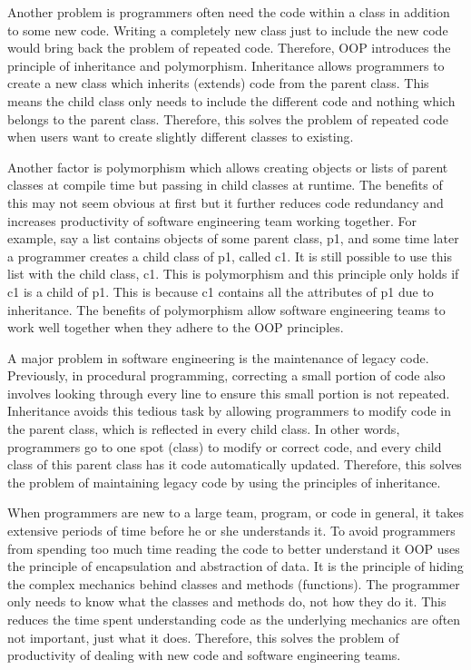 \documentclass[11pt]{article} %
\begin{document}
Another problem is programmers often need the code within a class in addition to some new code. Writing a completely new class just to include the new code would bring back the problem of repeated code. Therefore, OOP introduces the principle of inheritance and polymorphism. Inheritance allows programmers to create a new class which inherits (extends) code from the parent class. This means the child class only needs to include the different code and nothing which belongs to the parent class. Therefore, this solves the problem of repeated code when users want to create slightly different classes to existing.

Another factor is polymorphism which allows creating objects or lists of parent classes at compile time but passing in child classes at runtime. The benefits of this may not seem obvious at first but it further reduces code redundancy and increases productivity of software engineering team working together. For example, say a list contains objects of some parent class, p1, and some time later a programmer creates a child class of p1, called c1. It is still possible to use this list with the child class, c1. This is polymorphism and this principle only holds if c1 is a child of p1. This is because c1 contains all the attributes of p1 due to inheritance. The benefits of polymorphism allow software engineering teams to work well together when they adhere to the OOP principles. 

A major problem in software engineering is the maintenance of legacy code. Previously, in procedural programming, correcting a small portion of code also involves looking through every line to ensure this small portion is not repeated. Inheritance avoids this tedious task by allowing programmers to modify code in the parent class, which is reflected in every child class. In other words, programmers go to one spot (class) to modify or correct code, and every child class of this parent class has it code automatically updated. Therefore, this solves the problem of maintaining legacy code by using the principles of inheritance.

When programmers are new to a large team, program, or code in general, it takes extensive periods of time before he or she understands it. To avoid programmers from spending too much time reading the code to better understand it OOP uses the principle of encapsulation and abstraction of data. It is the principle of hiding the complex mechanics behind classes and  methods (functions). The programmer only needs to know what the classes and methods do, not how they do it. This reduces the time spent understanding code as the underlying mechanics are often not important, just what it does. Therefore, this solves the problem of productivity of dealing with new code and software engineering teams.
\end{document}
